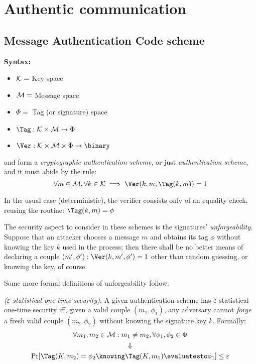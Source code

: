 
\section{Authentic communication}


\subsection{Message Authentication Code scheme}

\textbf{Syntax:}

\begin{itemize}
    \item $\mathcal{K} = $ Key space
    \item $\mathcal{M} = $ Message space
    \item $\Phi = $ Tag (or signature) space
    \item $\Tag: \K \times \M \to \Phi$
    \item $\Ver: \K \times \M \times \Phi \to \binary$
\end{itemize}

\Tag{} and \Ver{} form a \emph{cryptographic authentication scheme}, or just \emph{authentication scheme}, and it must abide by the rule:
\[
    \forall m \in \M, \forall k \in \K \implies \Ver(k, m, \Tag(k, m)) = 1
\]

In the usual case (deterministic), the verifier consists only of an equality check, reusing the \Tag{} routine: $\Tag(k, m) = \phi$

The security aspect to consider in these schemes is the signatures' \emph{unforgeability}. Suppose that an attacker chooses a message $m$ and obtains its tag $\phi$ without knowing the key $k$ used in the process; then there shall be no better means of declaring a couple $(m', \phi') : \Ver(k, m', \phi') = 1$ other than random guessing, or knowing the key, of course.

Some more formal definitions of unforgeability follow:

\begin{definition} \emph{($\varepsilon$-statistical one-time security)}:
    A given authentication scheme has $\varepsilon$-statistical one-time security iff, given a valid couple $(m_1, \phi_1)$, any adversary cannot \emph{forge} a fresh valid couple $(m_2, \phi_2)$ without knowing the signature key $k$. Formally:
    \begin{gather*}
        \forall m_1, m_2 \in \M : m_1 \neq m_2, \forall \phi_1, \phi_2 \in \Phi \\
        \Downarrow \\
        \Pr[\Tag(K, m_2) = \phi_2 \knowing \Tag(K, m_1) \evaluatesto \phi_1] \leq \varepsilon
    \end{gather*}
\end{definition}

